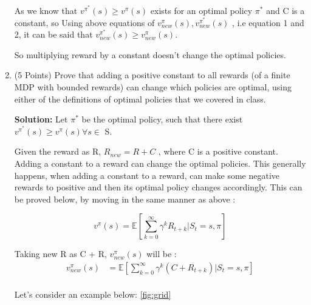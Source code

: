\documentclass{article}
\begin{document}
\begin{enumerate}
    As we know that $v^{\pi^*}(s) \geq v^{\pi}(s)$ exists for an optimal policy $\pi^*$ and C is a constant, so Using above equations of $v^{\pi}_{new}(s) , v^{\pi^*}_{new}(s)$ , i.e equation 1 and 2, it can be said that $v^{\pi^*}_{new}(s) \geq v^{\pi}_{new}(s)$.
    
    So multiplying reward by a constant doesn't change the optimal policies.
    
    
    \item (5 Points) Prove that adding a positive constant to all rewards (of a finite MDP with bounded rewards) can change which policies are optimal, using either of the definitions of optimal policies that we covered in class.
    
    \textbf{Solution:} Let $\pi^*$ be the optimal policy, such that there exist $v^{\pi^*}(s) \geq v^{\pi}(s) \forall s \in$ S.
    
     Given the reward as R, $R_{new} = R + C$ , where C is a positive constant. Adding a constant to a reward can change the optimal policies. 
     This generally happens, when adding a constant to a reward, can make some negative rewards to positive and then its optimal policy changes accordingly. This can be proved below, by moving in the same manner as above :
     
     \[v^{\pi}(s) =\mathbb{E}[\sum_{k=0}^{\infty}{\gamma^k R_{t+k} | S_t = s, \pi}]\]	
     
     Taking new R as C + R, $v^{\pi}_{new}(s)$ will be :
     \begin{align}
     v^{\pi}_{new}(s) &=\mathbb{E}[\sum_{k=0}^{\infty}{\gamma^k (C + R_{t+k} ) | S_t = s, \pi}] \nonumber \\
     \end{align}
     
     Let's consider an example below: \ref{fig:grid}
    

\end{enumerate}
\end{document}
